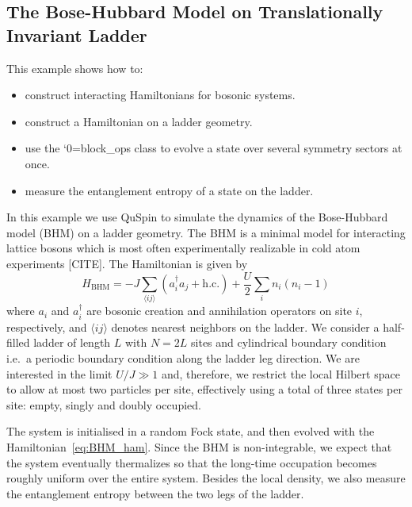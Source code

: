 \documentclass{SciPost}
\newcommand\0{\scalebox{-1}[1]{0}}
\let\svttfamily\ttfamily
\renewcommand\ttfamily{\svttfamily\catcode`0=\active }
\renewcommand\texttt{\bgroup\ttfamily\texttthelp}
\def\texttthelp#1{#1\egroup}
\begin{document}
\subsection{The Bose-Hubbard Model on Translationally Invariant Ladder}
\label{subsec:Bose_Ladder}

This example shows how to:
\begin{itemize}
	\item construct interacting Hamiltonians for bosonic systems.
	\item construct a Hamiltonian on a ladder geometry.
	\item use the \texttt{block\_ops} class to evolve a state over several symmetry sectors at once.
	\item measure the entanglement entropy of a state on the ladder.
\end{itemize}

 In this example we use QuSpin to simulate the dynamics of the Bose-Hubbard model (BHM) on a ladder geometry. The BHM is a minimal model for interacting lattice bosons which is most often experimentally realizable in cold atom experiments [CITE]. The Hamiltonian is given by
\begin{equation}
	H_\mathrm{BHM} = -J\sum_{\langle ij\rangle} \left(a_i^\dagger a_j + \mathrm{h.c.}\right) + \frac{U}{2}\sum_{i}n_i(n_i-1)
	\label{eq:BHM_ham}
\end{equation} 
where $a_i$ and $a^\dagger_i$ are bosonic creation and annihilation operators on site $i$, respectively, and $\langle ij\rangle$ denotes nearest neighbors on the ladder. We consider a half-filled ladder of length $L$ with $N=2L$ sites and cylindrical boundary condition i.e.~a periodic boundary condition along the ladder leg direction. We are interested in the limit $U/J\gg 1$ and, therefore, we restrict the local Hilbert space to allow at most two particles per site, effectively using a total of three states per site: empty, singly and doubly occupied.  

The system is initialised in a random Fock state, and then evolved with the Hamiltonian~\eqref{eq:BHM_ham}.  Since the BHM is non-integrable, we expect that the system eventually thermalizes so that the long-time occupation becomes roughly uniform over the entire system. Besides the local density, we also measure the entanglement entropy between the two legs of the ladder.
\end{document}
